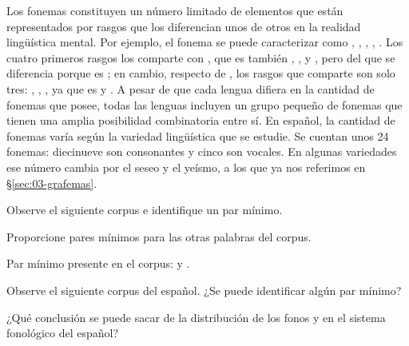 \begin{recuadro}
Los fonemas constituyen un número limitado de elementos que están representados
por rasgos que los diferencian unos de otros en la realidad lingüística mental.
Por ejemplo, el fonema  se puede caracterizar como ,
, , , . Los cuatro primeros
rasgos los comparte con , que es también ,
,  y , pero del que se diferencia porque
 es ; en cambio, respecto de , los rasgos que
comparte son solo tres: , ,
, ya que  es  y . A pesar de que
cada lengua difiera en la cantidad de fonemas que posee, todas las lenguas
incluyen un grupo pequeño de fonemas que tienen una amplia posibilidad
combinatoria entre sí. En español, la cantidad de fonemas varía según la
variedad lingüística que se estudie. Se cuentan unos 24 fonemas: diecinueve son
consonantes y cinco son vocales. En algunas variedades ese número cambia por el
seseo y el yeísmo, a los que ya nos referimos en §\ref{sec:03-grafemas}.
\end{recuadro}

\begin{ejercicio}\label{ej:03-paresminimos}
\begin{consignas}
  \item Observe el siguiente corpus e identifique un par mínimo.
  \item Proporcione pares mínimos para las otras palabras del corpus.
\end{consignas}

      
    

\begin{resuelto}
Par mínimo presente en el corpus:  y .
\end{resuelto}
\end{ejercicio}

\begin{ejercicio}\label{ej:03-ue}
\begin{consignas}
  \item Observe el siguiente corpus del español. ¿Se puede identificar algún par
        mínimo?
  \item ¿Qué conclusión se puede sacar de la distribución de los fonos 
        y  en el sistema fonológico del español?
\end{consignas}

     
    
\end{ejercicio}

